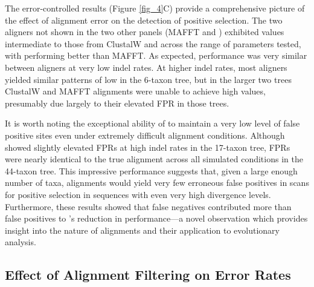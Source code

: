 The error-controlled \tpr results (Figure \ref{fig_4}C) provide a
comprehensive picture of the effect of alignment error on the detection of
\sw positive selection. The two aligners not shown in the two other
panels (MAFFT and \pranka) exhibited \tpr values intermediate to those
from ClustalW and \prankc across the range of parameters tested, with \pranka performing
better than MAFFT. As
expected, performance was very similar between aligners at very low
indel rates. At higher indel rates, most aligners yielded similar
patterns of low \tpr in the 6-taxon tree, but in the larger two trees
ClustalW and MAFFT alignments were unable to achieve high \tpr
values, presumably due largely to their elevated FPR in those trees.

It is worth noting the exceptional ability of \prankc to maintain a
very low level of false positive sites even under extremely difficult
alignment conditions. Although \prankc showed slightly elevated FPRs
at high indel rates in the 17-taxon tree, FPRs were nearly identical
to the true alignment across all simulated conditions in the 44-taxon
tree. This impressive performance suggests that, given a large enough
number of taxa, \prankc alignments would yield very few erroneous
false positives in scans for positive selection in sequences with even very
high divergence levels. Furthermore, these results showed that false
negatives contributed more than false positives to \prankc{}'s
reduction in \sw performance---a novel observation which provides
insight into the nature of \prankc alignments and their application to
\sw evolutionary analysis.

\subsection{Effect of Alignment Filtering on \Sw Error Rates}

